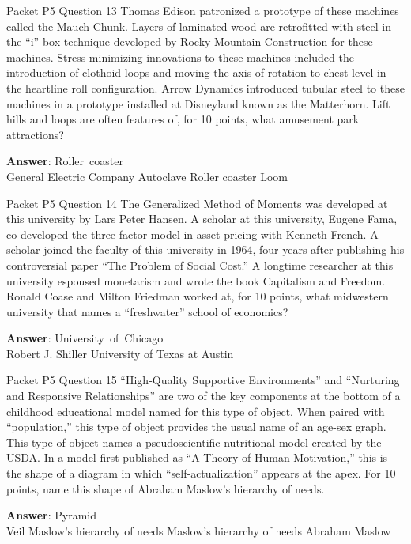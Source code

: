 \begin{frame}{Packet P5 Question 13}
Thomas Edison patronized   a prototype of these machines called the Mauch Chunk. Layers of laminated wood are retrofitted with steel in the ``i''-box technique developed by Rocky Mountain Construction for these machines. Stress-minimizing innovations to these machines included the introduction of clothoid loops and moving the axis of rotation to chest level in the heartline roll configuration. Arrow Dynamics introduced tubular steel to these machines in a prototype installed at Disneyland known as the   Matterhorn. Lift hills and loops are often features of, for 10 points, what amusement park attractions?    

\textbf{Answer}: Roller\ coaster\\
 General Electric Company
 Autoclave
 Roller coaster
 Loom
\end{frame}

\begin{frame}{Packet P5 Question 14}
The Generalized Method of Moments was developed at this university by Lars Peter Hansen. A scholar at this university, Eugene Fama, co-developed the three-factor model in asset pricing   with Kenneth French. A scholar joined the faculty of this university in 1964, four years after publishing his controversial   paper “The Problem of Social Cost.” A longtime researcher at this university espoused monetarism and wrote the book Capitalism and Freedom. Ronald Coase   and Milton Friedman worked at, for 10 points, what midwestern university that names a ``freshwater'' school of economics?  

\textbf{Answer}: University\ of\ Chicago\\
 Robert J. Shiller
 University of Texas at Austin
\end{frame}

\begin{frame}{Packet P5 Question 15}
“High-Quality Supportive Environments” and “Nurturing and Responsive Relationships” are two of the key components at the bottom of a childhood educational model named for this type of object. When paired with ``population,''   this type of object provides the usual name of an age-sex graph. This type of object names a pseudoscientific nutritional model created by the USDA. In a model first published as “A Theory of Human Motivation,” this is the shape of a diagram in which “self-actualization” appears at the apex. For 10 points, name this shape of Abraham Maslow’s   hierarchy of needs.    

\textbf{Answer}: Pyramid\\
 Veil
 Maslow's hierarchy of needs
 Maslow's hierarchy of needs
 Abraham Maslow
\end{frame}

